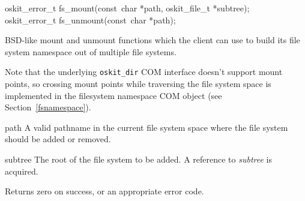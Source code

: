 
%
\label{fs-mount}
\label{fs-unmount}
\begin{apisyn}

        \funcproto oskit_error_t 
		fs_mount(const~char *path, oskit_file_t *subtree); \\
	\funcproto oskit_error_t fs_unmount(const~char *path);
\end{apisyn}
\begin{apidesc}
	BSD-like mount and unmount functions which the client can use
	to build its file system namespace out of multiple file systems.
	
	Note that the underlying \texttt{oskit_dir} COM interface 
	doesn't support mount points, so crossing mount points while
	traversing the file system space is implemented in the filesystem
	namespace COM object (see Section~\ref{fsnamespace}).
\end{apidesc}
\begin{apiparm}
	\item[path] A valid pathname in the current file system space
		where the file system should be added or removed.
	\item[subtree] The root of the file system to be added.
		A reference to \emph{subtree} is acquired.
\end{apiparm}
\begin{apiret}
	Returns zero on success, or an appropriate error code.
\end{apiret}

